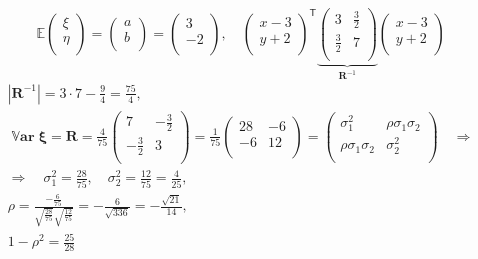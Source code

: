 \documentclass[12pt]{spbstu-task}
\begin{document}
\begin{displaymath}
  \mathbb{E}\begin{pmatrix}
    \xi \\
    \eta \\
  \end{pmatrix} = \begin{pmatrix}
    a \\
    b \\
  \end{pmatrix} = \begin{pmatrix}
    3 \\
    -2 \\
  \end{pmatrix},\quad
  \begin{pmatrix}
    x - 3 \\
    y + 2 \\
  \end{pmatrix}^\mathsf{T}
  \underbrace{\begin{pmatrix}
    3 & \frac{3}{2} \\
    \frac{3}{2} & 7 \\
  \end{pmatrix}}_{\mathbf{R}^{-1}}\begin{pmatrix}
    x - 3 \\
    y + 2 \\
  \end{pmatrix}
\end{displaymath}
\begin{gather*}
  \left|\mathbf{R}^{-1}\right| = 3\cdot 7 - \frac{9}{4} = \frac{75}{4}, \\
  \operatorname{\mathbb{V}\mathbf{ar}}\boldsymbol{\xi} = \mathbf{R} = \frac{4}{75}\begin{pmatrix}
    7 & -\frac{3}{2} \\
    -\frac{3}{2} & 3 \\
  \end{pmatrix} = \frac{1}{75}\begin{pmatrix}
    28 & -6 \\
    -6 & 12 \\
  \end{pmatrix} = \begin{pmatrix}
    \sigma_1^2 & \rho\sigma_1\sigma_2 \\
    \rho\sigma_1\sigma_2 & \sigma_2^2 \\
  \end{pmatrix}\quad\Rightarrow \\
  \Rightarrow\quad\sigma_1^2 = \frac{28}{75},\quad\sigma_2^2 = \frac{12}{75} = \frac{4}{25}, \\
  \rho = \frac{-\frac{6}{75}}{\sqrt{\frac{28}{75}}\sqrt{\frac{12}{75}}} = -\frac{6}{\sqrt{336}} = -\frac{\sqrt{21}}{14},
  \\ 1 - \rho^2 = \frac{25}{28}
\end{gather*}
\end{document}
